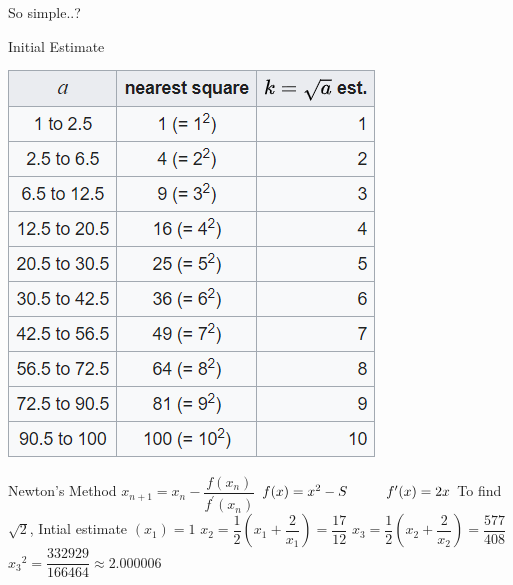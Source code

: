 \documentclass[10pt]{beamer}
\begin{document}

\begin{frame}{So simple..?}
    \begin{center}
        
    \end{center}
\end{frame}

\begin{frame}{Initial Estimate}
    \begin{center}
         \includegraphics[scale=0.8]{images/look_up.PNG}
    \end{center}
\end{frame}

\begin{frame}{Newton's Method}
        $x_{n+1} = x_n - \dfrac{f(x_n)}{f^\prime(x_n)}$
        \newline
        \newline
        $f(x) = {x}^2 - S \hspace{10mm}   f^\prime(x) = 2x$
        \newline
        \newline
        To find $\sqrt{2}$, Intial estimate $(x_1) = 1$
        \newline
        \newline
        $x_2 = \dfrac{1}{2}(x_1 + \dfrac{2}{x_1}) = \dfrac{17}{12}$
        \newline
        \newline
        $x_3 = \dfrac{1}{2}(x_2 + \dfrac{2}{x_2}) = \dfrac{577}{408}$
        \newline
        \newline
        ${x_3}^2 = \dfrac{332929}{166464} \approx 2.000006$
\end{frame}
\end{document}
